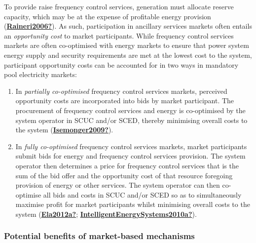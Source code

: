 \documentclass[12pt,a4paper,]{report}
\begin{document}
To provide raise frequency control services, generation must allocate
reserve capacity, which may be at the expense of profitable energy
provision (\protect\hyperlink{ref-Raineri2006}{\textbf{Raineri2006?}}).
As such, participation in ancillary services markets often entails an
\emph{opportunity cost} to market participants. While frequency control
services markets are often co-optimised with energy markets to ensure
that power system energy supply and security requirements are met at the
lowest cost to the system, participant opportunity costs can be
accounted for in two ways in mandatory pool electricity markets:

\begin{enumerate}
\def\labelenumi{\arabic{enumi}.}
\item
  In \emph{partially co-optimised} frequency control services markets,
  perceived opportunity costs are incorporated into bids by market
  participant. The procurement of frequency control services and energy
  is co-optimised by the system operator in SCUC and/or SCED, thereby
  minimising overall costs to the system
  (\protect\hyperlink{ref-Isemonger2009}{\textbf{Isemonger2009?}}).
\item
  In \emph{fully co-optimised} frequency control services markets,
  market participants submit bids for energy and frequency control
  services provision. The system operator then determines a price for
  frequency control services that is the sum of the bid offer and the
  opportunity cost of that resource foregoing provision of energy or
  other services. The system operator can then co-optimise all bids and
  costs in SCUC and/or SCED so as to simultaneously maximise profit for
  market participants whilst minimising overall costs to the system
  (\protect\hyperlink{ref-Ela2012a}{\textbf{Ela2012a?}};
  \protect\hyperlink{ref-IntelligentEnergySystems2010a}{\textbf{IntelligentEnergySystems2010a?}}).
\end{enumerate}

\hypertarget{potential-benefits-of-market-based-mechanisms}{%
\subsubsection{Potential benefits of market-based
mechanisms}\label{potential-benefits-of-market-based-mechanisms}}
\end{document}
